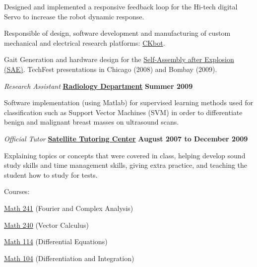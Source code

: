 \documentclass[10pt]{article}
\newenvironment{outerlist}[1][\enskip\textbullet]%
        {\begin{itemize}[#1]}{\end{itemize}%
         \vspace{-.6\baselineskip}}
\newenvironment{innerlist}[1][\enskip\textbullet]%
        {\begin{compactitem}[#1]}{\end{compactitem}}
\begin{document}
\begin{outerlist}
\begin{innerlist}
        \item Designed and implemented a responsive feedback loop for the Hi-tech digital Servo to increase the robot 	
        dynamic response.

        \item Responsible of design, software development and manufacturing of custom mechanical and electrical research 	
        platforms: 
        \href{http://modlabupenn.org/ckbot/}{CKbot}.
        \item Gait Generation and hardware design for the 									  		  
        \href{http://modlabupenn.org/self-re-assembly-after-explosion/}
        {Self-Assembly after Explosion (SAE)}. TechFest presentations in Chicago (2008) and Bombay (2009).  
        
    \end{innerlist}

\item[] \textit{Research Assistant }\href{http://modlabupenn.org/}{\textbf{Radiology Department}}
        \hfill \textbf{Summer 2009}
\begin{innerlist}
\item Software implementation (using Matlab) for supervised learning methods used for classification such as Support Vector 					Machines (SVM) in order to differentiate benign and malignant breast masses on ultrasound scans.   
\end{innerlist}

\item[] \textit{Official Tutor }\href{http://www.vpul.upenn.edu/tutoring/}{\textbf{Satellite Tutoring Center}}
        \hfill \textbf{August 2007 to December 2009}
\begin{innerlist}
\item Explaining topics or concepts that were covered in class, helping develop sound study skills and time management skills, 				giving extra practice, and teaching the student how to study for tests. 
\item Courses:
		\begin{innerlist}
				\item \href{http://www.math.upenn.edu/ugrad/calc/m241/}{Math 241} (Fourier and Complex Analysis)
				\item \href{http://www.math.upenn.edu/ugrad/calc/m240/}{Math 240} (Vector Calculus)
				\item \href{http://www.math.upenn.edu/ugrad/calc/m114/}{Math 114} (Differential Equations)
				\item \href{http://www.math.upenn.edu/ugrad/calc/m104/}{Math 104} (Differentiation and Integration)
		\end{innerlist} 
\end{innerlist}
\end{outerlist}
\end{document}
